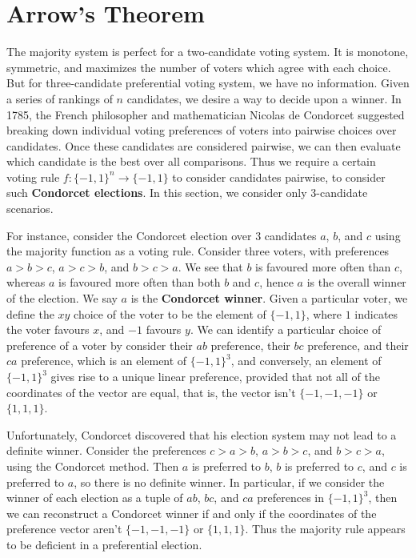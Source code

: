 \section{Arrow's Theorem}

The majority system is perfect for a two-candidate voting system. It is monotone, symmetric, and maximizes the number of voters which agree with each choice. But for three-candidate preferential voting system, we have no information. Given a series of rankings of $n$ candidates, we desire a way to decide upon a winner. In 1785, the French philosopher and mathematician Nicolas de Condorcet suggested breaking down individual voting preferences of voters into pairwise choices over candidates. Once these candidates are considered pairwise, we can then evaluate which candidate is the best over all comparisons. Thus we require a certain voting rule $f: \{ -1, 1 \}^n \to \{ -1, 1 \}$ to consider candidates pairwise, to consider such {\bf Condorcet elections}. In this section, we consider only 3-candidate scenarios.

For instance, consider the Condorcet election over 3 candidates $a$, $b$, and $c$ using the majority function as a voting rule. Consider three voters, with preferences $a > b > c$, $a > c > b$, and $b > c > a$. We see that $b$ is favoured more often than $c$, whereas $a$ is favoured more often than both $b$ and $c$, hence $a$ is the overall winner of the election. We say $a$ is the {\bf Condorcet winner}. Given a particular voter, we define the $xy$ choice of the voter to be the element of $\{ -1, 1 \}$, where $1$ indicates the voter favours $x$, and $-1$ favours $y$. We can identify a particular choice of preference of a voter by consider their $ab$ preference, their $bc$ preference, and their $ca$ preference, which is an element of $\{ -1, 1 \}^3$, and conversely, an element of $\{ -1, 1 \}^3$ gives rise to a unique linear preference, provided that not all of the coordinates of the vector are equal, that is, the vector isn't $\{ -1, -1, -1 \}$ or $\{ 1, 1, 1 \}$.

Unfortunately, Condorcet discovered that his election system may not lead to a definite winner. Consider the preferences $c > a > b$, $a > b > c$, and $b > c > a$, using the Condorcet method. Then $a$ is preferred to $b$, $b$ is preferred to $c$, and $c$ is preferred to $a$, so there is no definite winner. In particular, if we consider the winner of each election as a tuple of $ab$, $bc$, and $ca$ preferences in $\{ -1, 1 \}^3$, then we can reconstruct a Condorcet winner if and only if the coordinates of the preference vector aren't $\{ -1, -1, -1 \}$ or $\{ 1, 1, 1 \}$. Thus the majority rule appears to be deficient in a preferential election.

